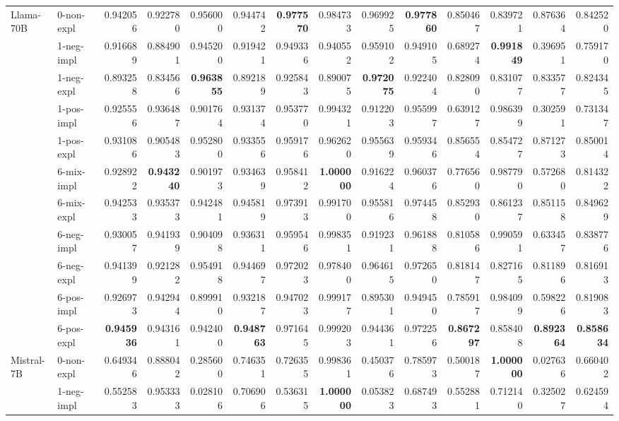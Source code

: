 \begin{tabular}{ll|rrrr|rrrr|rrrr}
 \midrule
\multirow[t]{11}{*}{Llama-70B} & 0-non-expl & 0.942056 & 0.922780 & 0.956000 & 0.944742 & \bfseries 0.977570 & 0.984733 & 0.969925 & \bfseries 0.977860 & 0.850467 & 0.839721 & 0.876364 & 0.842520 \\
 & 1-neg-impl & 0.916689 & 0.884901 & 0.945200 & 0.919421 & 0.949336 & 0.940552 & 0.959102 & 0.949105 & 0.689274 & \bfseries 0.991849 & 0.396951 & 0.759170 \\
 & 1-neg-expl & 0.893258 & 0.834566 & \bfseries 0.963855 & 0.892189 & 0.925843 & 0.890075 & \bfseries 0.972075 & 0.922404 & 0.828090 & 0.831077 & 0.833577 & 0.824345 \\
 & 1-pos-impl & 0.925556 & 0.936487 & 0.901764 & 0.931374 & 0.953770 & 0.994321 & 0.912203 & 0.955997 & 0.639127 & 0.986399 & 0.302591 & 0.731347 \\
 & 1-pos-expl & 0.931086 & 0.905483 & 0.952800 & 0.933556 & 0.959176 & 0.962620 & 0.955639 & 0.959346 & 0.856554 & 0.854727 & 0.871273 & 0.850014 \\
 & 6-mix-impl & 0.928922 & \bfseries 0.943240 & 0.901973 & 0.934639 & 0.958412 & \bfseries 1.000000 & 0.916224 & 0.960376 & 0.776560 & 0.987790 & 0.572680 & 0.814322 \\
 & 6-mix-expl & 0.942533 & 0.935373 & 0.942481 & 0.945819 & 0.973913 & 0.991700 & 0.955816 & 0.974458 & 0.852930 & 0.861237 & 0.851158 & 0.849629 \\
 & 6-neg-impl & 0.930057 & 0.941939 & 0.904098 & 0.936311 & 0.959546 & 0.998351 & 0.919231 & 0.961888 & 0.810586 & 0.990591 & 0.633457 & 0.838776 \\
 & 6-neg-expl & 0.941399 & 0.921282 & 0.954918 & 0.944697 & 0.972023 & 0.978400 & 0.964615 & 0.972650 & 0.818147 & 0.827165 & 0.811896 & 0.816913 \\
 & 6-pos-impl & 0.926973 & 0.942944 & 0.899910 & 0.932187 & 0.947023 & 0.999177 & 0.895301 & 0.949450 & 0.785917 & 0.984099 & 0.598226 & 0.819083 \\
 & 6-pos-expl & \bfseries 0.945936 & 0.943161 & 0.942400 & \bfseries 0.948763 & 0.971645 & 0.999203 & 0.944361 & 0.972256 & \bfseries 0.867297 & 0.858408 & \bfseries 0.892364 & \bfseries 0.858634 \\
 \midrule
\multirow[t]{11}{*}{Mistral-7B} & 0-non-expl & 0.649346 & 0.888042 & 0.285600 & 0.746351 & 0.726355 & 0.998361 & 0.450376 & 0.785973 & 0.500187 & \bfseries 1.000000 & 0.027636 & 0.660402 \\
 & 1-neg-impl & 0.552583 & 0.953333 & 0.028106 & 0.706906 & 0.536315 & \bfseries 1.000000 & 0.053823 & 0.687493 & 0.552881 & 0.712140 & 0.325027 & 0.624594 \\

\end{tabular}
